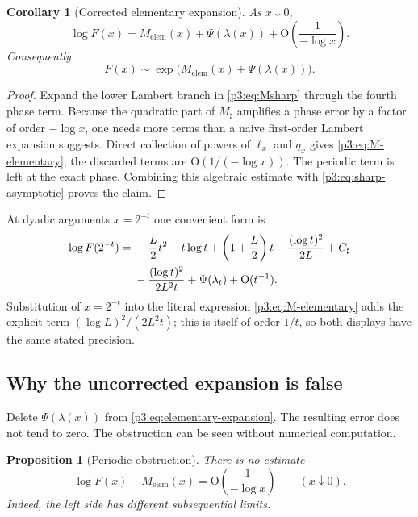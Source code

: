 \documentclass[11pt]{article}
\numberwithin{equation}{section}
\newtheorem{proposition}[theorem]{Proposition}
\newtheorem{corollary}[theorem]{Corollary}
\theoremstyle{definition}
\theoremstyle{remark}
\newcommand{\Oh}{\mathrm O}
\begin{document}
\begin{corollary}[Corrected elementary expansion]\label{p3:cor:elementary-expansion}
As $x\downarrow0$,
\begin{equation}\label{p3:eq:elementary-expansion}
\boxed{
 \log F(x)=M_{\mathrm{elem}}(x)+\Psi(\lambda(x))
 +\Oh\!\left(\frac1{-\log x}\right).}
\end{equation}
Consequently
\begin{equation}\label{p3:eq:elementary-F-equivalent}
 F(x)\sim
 \exp\!\bigl(M_{\mathrm{elem}}(x)+\Psi(\lambda(x))\bigr).
\end{equation}
\end{corollary}

\begin{proof}
Expand the lower Lambert branch in \eqref{p3:eq:Msharp} through the fourth phase
term.  Because the quadratic part of $M_\sharp$ amplifies a phase error by a
factor of order $-\log x$, one needs more terms than a naive first-order
Lambert expansion suggests.  Direct collection of powers of $\ell_x$ and
$q_x$ gives \eqref{p3:eq:M-elementary}; the discarded terms are
$\Oh(1/(-\log x))$.  The periodic term is left at the exact phase.  Combining
this algebraic estimate with \eqref{p3:eq:sharp-asymptotic} proves the claim.
\end{proof}

At dyadic arguments $x=2^{-t}$ one convenient form is
\begin{align}
 \log F(2^{-t})={}&-\frac L2t^2-t\log t
 +\left(1+\frac L2\right)t
 -\frac{(\log t)^2}{2L}+C_\sharp
 \notag\\
 &-\frac{(\log t)^2}{2L^2t}
 +\Psi(\lambda_t)+\Oh(t^{-1}).
 \label{p3:eq:dyadic-explicit-asymptotic}
\end{align}
Substitution of $x=2^{-t}$ into the literal expression
\eqref{p3:eq:M-elementary} adds the explicit term
$(\log L)^2/(2L^2t)$; this is itself of order $1/t$, so both displays have the
same stated precision.

\subsection{Why the uncorrected expansion is false}

Delete $\Psi(\lambda(x))$ from \eqref{p3:eq:elementary-expansion}.  The resulting
error does not tend to zero.  The obstruction can be seen without numerical
computation.

\begin{proposition}[Periodic obstruction]\label{p3:prop:periodic-obstruction}
There is no estimate
\begin{equation}\label{p3:eq:false-uncorrected}
 \log F(x)-M_{\mathrm{elem}}(x)
 =\Oh\!\left(\frac1{-\log x}\right)
 \qquad(x\downarrow0).
\end{equation}
Indeed, the left side has different subsequential limits.
\end{proposition}
\end{document}
